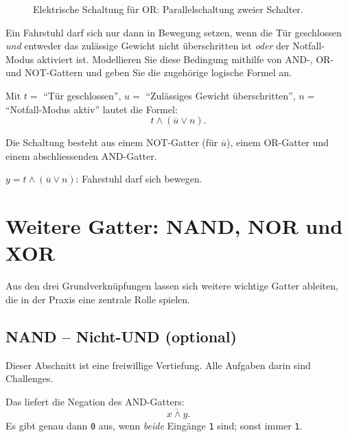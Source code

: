 \begin{figure}[H]
    \centering
    
    \caption{Elektrische Schaltung für OR: Parallelschaltung zweier Schalter.}
    \label{fig:or_schaltung}
\end{figure}

\begin{myexercise}\label{myexercise:gatter-anwendung}
    Ein Fahrstuhl darf sich nur dann in Bewegung setzen, wenn die Tür geschlossen \emph{und} entweder das zulässige Gewicht nicht überschritten ist \emph{oder} der Notfall-Modus aktiviert ist. Modellieren Sie diese Bedingung mithilfe von AND-, OR- und NOT-Gattern und geben Sie die zugehörige logische Formel an.
    \begin{myanswer}
        Mit $t=$ \enquote{Tür geschlossen}, $u=$ \enquote{Zulässiges Gewicht überschritten}, $n=$ \enquote{Notfall-Modus aktiv} lautet die Formel:
        \[
            t \wedge (\overline{u} \vee n).
        \]

        Die Schaltung besteht aus einem NOT-Gatter (für $\overline{u}$), einem OR-Gatter und einem abschliessenden AND-Gatter.
        \begin{center}
            

            $y = t \wedge (\overline{u} \vee n)$: Fahrstuhl darf sich bewegen.
        \end{center}
    \end{myanswer}
\end{myexercise}

\section{Weitere Gatter: NAND, NOR und XOR}

Aus den drei Grundverknüpfungen lassen sich weitere wichtige Gatter ableiten, die in der Praxis eine zentrale Rolle spielen.

\subsection{NAND -- Nicht-UND (optional)}

Dieser Abschnitt ist eine freiwillige Vertiefung. Alle Aufgaben darin sind Challenges.

\begin{mydefinition}
    Das  liefert die Negation des AND-Gatters:
    \[
        \overline{x \wedge y}.
    \]
    Es gibt genau dann \texttt{0} aus, wenn \emph{beide} Eingänge \texttt{1} sind; sonst immer \texttt{1}.
\end{mydefinition}

